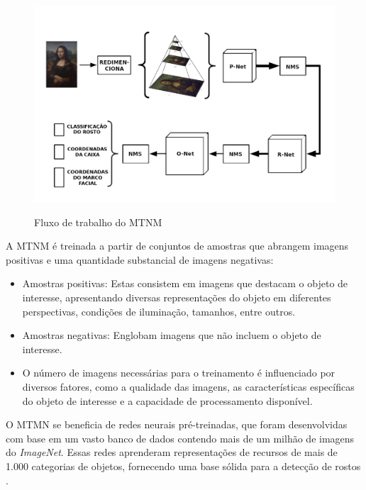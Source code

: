 \begin{figure}[h!]
    \centering
    \caption{Fluxo de trabalho do MTNM}
    \includegraphics[scale=0.25]{figuras/mtmn.png}
    \label{fig:mtmn}
    \centering
\end{figure}

A MTNM é treinada a partir de conjuntos de amostras que abrangem imagens positivas e 
uma quantidade substancial de imagens negativas:

\begin{itemize}
    \item  Amostras positivas: Estas consistem em imagens que destacam o objeto 
    de interesse, apresentando diversas representações do objeto em diferentes 
    perspectivas, condições de iluminação, tamanhos, entre outros.
  
    \item Amostras negativas: Englobam imagens que não incluem o objeto de interesse.
    
    \item O número de imagens necessárias para o treinamento é influenciado por 
    diversos fatores, como a qualidade das imagens, as características específicas 
    do objeto de interesse e a capacidade de processamento disponível.
\end{itemize}

O MTMN se beneficia de redes neurais pré-treinadas, 
que foram desenvolvidas com base em um vasto banco de 
dados contendo mais de um milhão de imagens do \textit{ImageNet}. 
Essas redes aprenderam representações de recursos de 
mais de 1.000 categorias de objetos, fornecendo uma 
base sólida para a detecção de rostos \cite[p. 5]{luna2022}.

